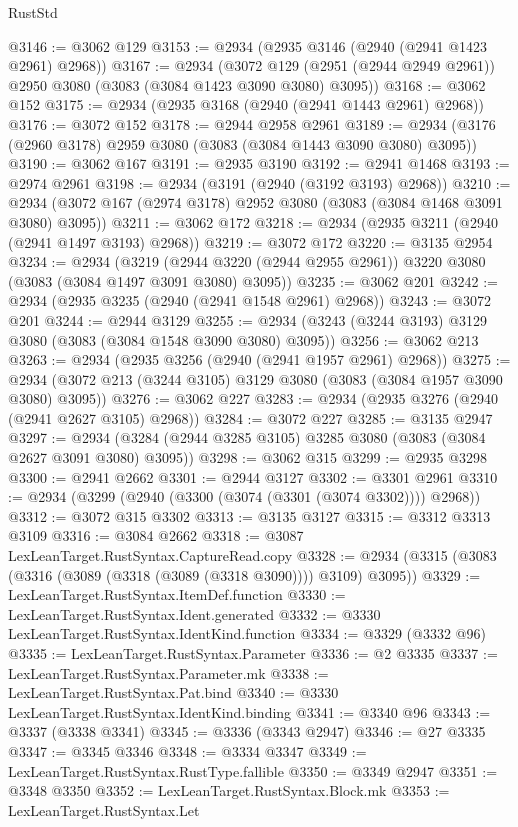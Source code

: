 \begin{lexlean}{RustStd}
\begin{coremodule}
@3146 := @3062 @129
@3153 := @2934 (@2935 @3146 (@2940 (@2941 @1423 @2961) @2968))
@3167 := @2934
    (@3072 @129 (@2951 (@2944 @2949 @2961)) @2950 @3080 (@3083 (@3084 @1423 @3090 @3080) @3095))
@3168 := @3062 @152
@3175 := @2934 (@2935 @3168 (@2940 (@2941 @1443 @2961) @2968))
@3176 := @3072 @152
@3178 := @2944 @2958 @2961
@3189 := @2934 (@3176 (@2960 @3178) @2959 @3080 (@3083 (@3084 @1443 @3090 @3080) @3095))
@3190 := @3062 @167
@3191 := @2935 @3190
@3192 := @2941 @1468
@3193 := @2974 @2961
@3198 := @2934 (@3191 (@2940 (@3192 @3193) @2968))
@3210 := @2934 (@3072 @167 (@2974 @3178) @2952 @3080 (@3083 (@3084 @1468 @3091 @3080) @3095))
@3211 := @3062 @172
@3218 := @2934 (@2935 @3211 (@2940 (@2941 @1497 @3193) @2968))
@3219 := @3072 @172
@3220 := @3135 @2954
@3234 := @2934
    (@3219 (@2944 @3220 (@2944 @2955 @2961)) @3220 @3080 (@3083 (@3084 @1497 @3091 @3080) @3095))
@3235 := @3062 @201
@3242 := @2934 (@2935 @3235 (@2940 (@2941 @1548 @2961) @2968))
@3243 := @3072 @201
@3244 := @2944 @3129
@3255 := @2934 (@3243 (@3244 @3193) @3129 @3080 (@3083 (@3084 @1548 @3090 @3080) @3095))
@3256 := @3062 @213
@3263 := @2934 (@2935 @3256 (@2940 (@2941 @1957 @2961) @2968))
@3275 := @2934 (@3072 @213 (@3244 @3105) @3129 @3080 (@3083 (@3084 @1957 @3090 @3080) @3095))
@3276 := @3062 @227
@3283 := @2934 (@2935 @3276 (@2940 (@2941 @2627 @3105) @2968))
@3284 := @3072 @227
@3285 := @3135 @2947
@3297 := @2934 (@3284 (@2944 @3285 @3105) @3285 @3080 (@3083 (@3084 @2627 @3091 @3080) @3095))
@3298 := @3062 @315
@3299 := @2935 @3298
@3300 := @2941 @2662
@3301 := @2944 @3127
@3302 := @3301 @2961
@3310 := @2934 (@3299 (@2940 (@3300 (@3074 (@3301 (@3074 @3302)))) @2968))
@3312 := @3072 @315 @3302
@3313 := @3135 @3127
@3315 := @3312 @3313 @3109
@3316 := @3084 @2662
@3318 := @3087 LexLeanTarget.RustSyntax.CaptureRead.copy
@3328 := @2934 (@3315 (@3083 (@3316 (@3089 (@3318 (@3089 (@3318 @3090)))) @3109) @3095))
@3329 := LexLeanTarget.RustSyntax.ItemDef.function
@3330 := LexLeanTarget.RustSyntax.Ident.generated
@3332 := @3330 LexLeanTarget.RustSyntax.IdentKind.function
@3334 := @3329 (@3332 @96)
@3335 := LexLeanTarget.RustSyntax.Parameter
@3336 := @2 @3335
@3337 := LexLeanTarget.RustSyntax.Parameter.mk
@3338 := LexLeanTarget.RustSyntax.Pat.bind
@3340 := @3330 LexLeanTarget.RustSyntax.IdentKind.binding
@3341 := @3340 @96
@3343 := @3337 (@3338 @3341)
@3345 := @3336 (@3343 @2947)
@3346 := @27 @3335
@3347 := @3345 @3346
@3348 := @3334 @3347
@3349 := LexLeanTarget.RustSyntax.RustType.fallible
@3350 := @3349 @2947
@3351 := @3348 @3350
@3352 := LexLeanTarget.RustSyntax.Block.mk
@3353 := LexLeanTarget.RustSyntax.Let

\end{coremodule}
\end{lexlean}
